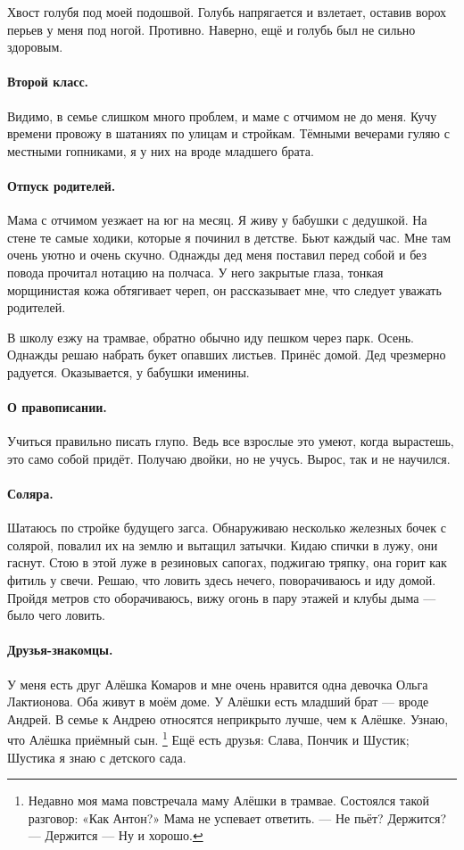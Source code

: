 \documentclass{book}
\begin{document}
Хвост голубя под моей подошвой.
Голубь напрягается и взлетает, оставив ворох перьев у меня под ногой.
Противно.
Наверно, ещё и голубь был не сильно здоровым.

\paragraph{Второй класс.} 
Видимо, в семье слишком много проблем, и маме с отчимом не до меня.
Кучу времени провожу в шатаниях по улицам и стройкам.
Тёмными вечерами гуляю с местными гопниками, 
я у них на вроде младшего брата.

\paragraph{Отпуск родителей.} 
Мама с отчимом уезжает на юг на месяц.
Я живу у бабушки с дедушкой.
На стене те самые ходики, которые я починил в детстве.
Бьют каждый час.
Мне там очень уютно и очень скучно.
Однажды дед меня поставил перед собой и без повода прочитал нотацию на полчаса.
У него закрытые глаза,
тонкая морщинистая кожа обтягивает череп, 
он рассказывает мне, что следует уважать родителей.

В школу езжу на трамвае, обратно обычно иду пешком через парк.
Осень.
Однажды решаю набрать букет опавших листьев.
Принёс домой. 
Дед чрезмерно радуется. 
Оказывается, у бабушки именины.

\paragraph{О правописании.}
Учиться правильно писать глупо. 
Ведь все взрослые это умеют,
когда вырастешь, это само собой придёт.
Получаю двойки, но не учусь. 
Вырос, так и не научился.

\paragraph{Соляра.}
Шатаюсь по стройке будущего загса.
Обнаруживаю несколько железных бочек с солярой,
повалил их на землю и вытащил затычки.
Кидаю спички в лужу, они гаснут.
Стою в этой луже в резиновых сапогах,
поджигаю тряпку, она горит как фитиль у свечи.
Решаю, что ловить здесь нечего, поворачиваюсь и иду домой.
Пройдя метров сто оборачиваюсь, вижу огонь в пару этажей и клубы дыма --- было чего ловить.

\paragraph{Друзья-знакомцы.}
У меня есть друг Алёшка Комаров
и мне очень нравится одна девочка Ольга Лактионова.
Оба живут в моём доме.
У Алёшки есть младший брат --- вроде Андрей.
В семье к Андрею относятся неприкрыто лучше, чем к Алёшке.
Узнаю, что Алёшка приёмный сын.%
\footnote{Недавно моя мама повстречала маму Алёшки в трамвае. Состоялся такой разговор: «Как Антон?» Мама не успевает ответить. --- Не пьёт? Держится? --- Держится --- Ну и хорошо.}
Ещё есть друзья: Слава, Пончик и Шустик;
Шустика я знаю с детского сада.
\end{document}
